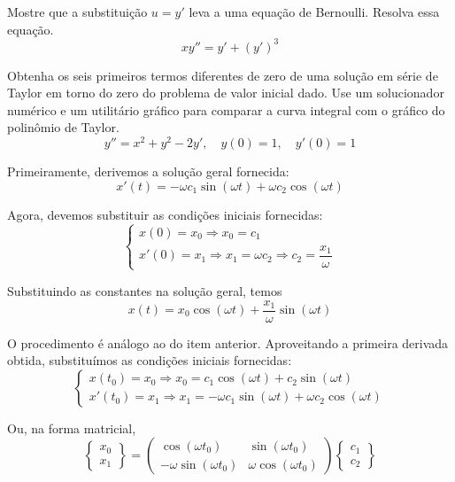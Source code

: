 \documentclass[oneside,12pt,a4paper]{report}
\begin{document}
 Mostre que a substituição $u=y'$ leva a uma equação de Bernoulli. Resolva essa equação.
\[xy''=y'+(y')^3\]

 Obtenha os seis primeiros termos diferentes de zero de uma solução em série de Taylor em torno do zero do problema de valor inicial dado. Use um solucionador numérico e um utilitário gráfico para comparar a curva integral com o gráfico do polinômio de Taylor.
\[y''=x^2+y^2-2y',\quad y(0)=1, \quad y'(0)=1\]

\newpage

\begin{resolucao}
    \itemresolucao Primeiramente, derivemos a solução geral fornecida:
        \[x'(t)=-\omega c_1\sin(\omega t)+\omega c_2\cos(\omega t)\]

    Agora, devemos substituir as condições iniciais fornecidas:
    \[\begin{cases}
        x(0)=x_0\Rightarrow \boxed{x_0=c_1}\\
        x'(0)=x_1\Rightarrow x_1=\omega c_2\Rightarrow \boxed{c_2=\dfrac{x_1}{\omega}}
    \end{cases}\]

    Substituindo as constantes na solução geral, temos
    \[\boxed{x(t)=x_0\cos(\omega t)+\frac{x_1}{\omega}\sin(\omega t)}\]

    \itemresolucao O procedimento é análogo ao do item anterior. Aproveitando a primeira derivada obtida, substituímos as condições iniciais fornecidas:
    \[\begin{cases}
        x(t_0)=x_0\Rightarrow x_0=c_1\cos(\omega t)+c_2\sin(\omega t)\\
        x'(t_0)=x_1\Rightarrow x_1=-\omega c_1\sin(\omega t)+\omega c_2\cos(\omega t)
    \end{cases}\]

    Ou, na forma matricial, 
    \[\begin{Bmatrix}
        x_0\\
        x_1
    \end{Bmatrix}
    =
    \begin{pmatrix}
        \cos(\omega t_0) & \sin(\omega t_0)\\
        -\omega\sin(\omega t_0) & \omega\cos(\omega t_0)
    \end{pmatrix}
    \begin{Bmatrix}
        c_1\\
        c_2
    \end{Bmatrix}\]


\end{resolucao}
\end{document}
